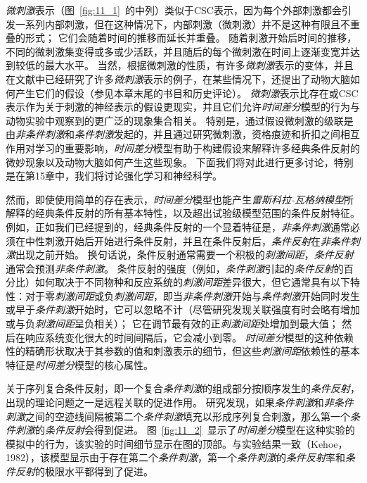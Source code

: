 \textit{微刺激}表示（图~\ref{fig:11_1}~的中列）类似于CSC表示，因为每个外部刺激都会引发一系列内部刺激，但在这种情况下，内部刺激（微刺激）并不是这种有限且不重叠的形式；
它们会随着时间的推移而延长并重叠。
随着刺激开始后时间的推移，不同的微刺激集变得或多或少活跃，并且随后的每个微刺激在时间上逐渐变宽并达到较低的最大水平。
当然，根据微刺激的性质，有许多\textit{微刺激}表示的变体，并且在文献中已经研究了许多\textit{微刺激}表示的例子，在某些情况下，还提出了动物大脑如何产生它们的假设（参见本章末尾的书目和历史评论）。
\textit{微刺激}表示比存在或CSC表示作为关于刺激的神经表示的假设更现实，并且它们允许\textit{时间差分}模型的行为与动物实验中观察到的更广泛的现象集合相关。
特别是，通过假设微刺激的级联是由\textit{非条件刺激}和\textit{条件刺激}发起的，并且通过研究微刺激，资格痕迹和折扣之间相互作用对学习的重要影响，\textit{时间差分}模型有助于构建假设来解释许多经典条件反射的微妙现象以及动物大脑如何产生这些现象。
下面我们将对此进行更多讨论，特别是在第15章中，我们将讨论强化学习和神经科学。


然而，即使使用简单的存在表示，\textit{时间差分}模型也能产生\textit{雷斯科拉-瓦格纳模型}所解释的经典条件反射的所有基本特性，以及超出试验级模型范围的条件反射特征。
例如，正如我们已经提到的，经典条件反射的一个显着特征是，\textit{非条件刺激}通常必须在中性刺激开始后开始进行条件反射，并且在条件反射后，\textit{条件反射}在\textit{非条件刺激}出现之前开始。
换句话说，条件反射通常需要一个积极的\textit{刺激间距}，\textit{条件反射}通常会预测\textit{非条件刺激}。
条件反射的强度（例如，\textit{条件刺激}引起的\textit{条件反射}的百分比）如何取决于不同物种和反应系统的\textit{刺激间距}差异很大，但它通常具有以下特性：对于零\textit{刺激间距}或负\textit{刺激间距}，即当\textit{非条件刺激}开始与\textit{条件刺激}开始同时发生或早于\textit{条件刺激}开始时，它可以忽略不计（尽管研究发现关联强度有时会略有增加或与负\textit{刺激间距}呈负相关）；
它在调节最有效的正\textit{刺激间距}处增加到最大值；
然后在响应系统变化很大的时间间隔后，它会减小到零。
\textit{时间差分}模型的这种依赖性的精确形状取决于其参数的值和刺激表示的细节，但这些\textit{刺激间距}依赖性的基本特征是\textit{时间差分}模型的核心属性。


关于序列复合条件反射，即一个复合\textit{条件刺激}的组成部分按顺序发生的\textit{条件反射}，出现的理论问题之一是远程关联的促进作用。
研究发现，如果\textit{条件刺激}和\textit{非条件刺激}之间的空迹线间隔被第二个\textit{条件刺激}填充以形成序列复合刺激，那么第一个\textit{条件刺激}的\textit{条件反射}会得到促进。
图~\ref{fig:11_2}~显示了\textit{时间差分}模型在这种实验的模拟中的行为，该实验的时间细节显示在图的顶部。与实验结果一致（Kehoe，1982），该模型显示由于存在第二个\textit{条件刺激}，第一个\textit{条件刺激}的\textit{条件反射}率和\textit{条件反射}的极限水平都得到了促进。

